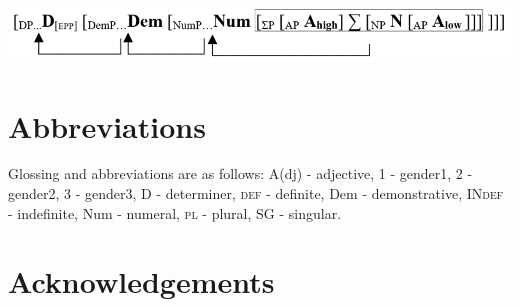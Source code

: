 \documentclass[output=paper]{langscibook}
\begin{document}
\ea\label{ex:baron:20}
\includegraphics[width=\textwidth]{figures/baron-img5.png}
\z
  








 





\section*{Abbreviations}

Glossing and abbreviations are as follows: A(dj) - adjective, 1 - gender1, 2 - gender2, 3 - gender3, D - determiner, \textsc{def} - definite, Dem - demonstrative, IN\textsc{def} - indefinite, Num - numeral, \textsc{pl} - plural, SG - singular.
\section*{Acknowledgements}

{\sloppy
\printbibliography[heading=subbibliography,notkeyword=this] 
}
\end{document}
